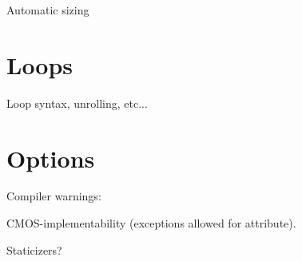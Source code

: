 Automatic sizing

\section{Loops}
\label{sec:prs:loops}

Loop syntax, unrolling, etc...

\section{Options}
\label{sec:prs:options}

Compiler warnings:

CMOS-implementability (exceptions allowed for attribute).  

Staticizers?

